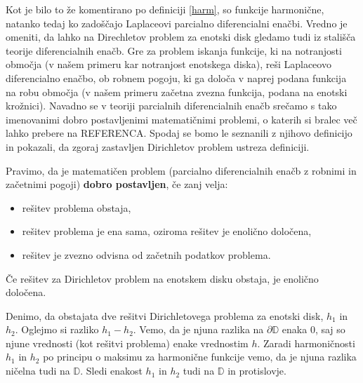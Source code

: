\documentclass[mat1]{fmfdelo}
\begin{document}
    \begin{opomba}
        Kot je bilo to že komentirano po definiciji \ref{harm}, so funkcije harmonične, natanko tedaj ko zadoščajo Laplaceovi parcialno diferencialni enačbi. 
        Vredno je omeniti, da lahko na Direchletov problem za enotski disk gledamo tudi iz stališča teorije diferencialnih enačb. Gre za problem iskanja funkcije, ki na notranjosti območja (v našem primeru kar notranjost enotskega diska), reši Laplaceovo diferencialno enačbo, ob robnem pogoju, ki ga določa v naprej podana funkcija na robu območja (v našem primeru začetna zvezna funkcija, podana na enotski krožnici). 
        Navadno se v teoriji parcialnih diferencialnih enačb srečamo s tako imenovanimi dobro postavljenimi matematičnimi problemi, o katerih si bralec več lahko prebere na REFERENCA. 
        Spodaj se bomo le seznanili z njihovo definicijo in pokazali, da zgoraj zastavljen Dirichletov problem ustreza definiciji. 
    \end{opomba}

    \begin{definicija}[J. Hadamard 1902]
        Pravimo, da je matematičen problem (parcialno diferencialnih enačb z robnimi in začetnimi pogoji) \textbf{dobro postavljen}, če zanj velja:
        \begin{itemize}
            \item rešitev problema obstaja,
            \item rešitev problema je ena sama, oziroma rešitev je enolično določena,
            \item rešitev je zvezno odvisna od začetnih podatkov problema.
        \end{itemize}
    \end{definicija}

    \begin{lema}
        \label{enolicno}
        Če rešitev za Dirichletov problem na enotskem disku obstaja, je enolično določena.
    \end{lema}
    \begin{dokaz}
        Denimo, da obstajata dve rešitvi Dirichletovega problema za enotski disk, $h_1$ in $h_2$.
        Oglejmo si razliko $h_1 - h_2$. Vemo, da je njuna razlika na $\partial \mathbb{D}$ enaka $0$, saj so njune vrednosti (kot rešitvi problema) enake vrednostim $h$. 
        Zaradi harmoničnosti $h_1$ in $h_2$ po principu o maksimu za harmonične funkcije vemo, da je njuna razlika ničelna tudi na $\mathbb{D}$. Sledi enakost $h_1$ in $h_2$ tudi na $\mathbb{D}$ in protislovje. 
    \end{dokaz}
    
\end{document}
